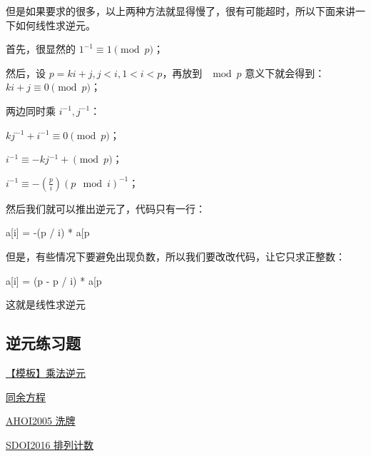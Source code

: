 但是如果要求的很多，以上两种方法就显得慢了，很有可能超时，所以下面来讲一下如何线性求逆元。

首先，很显然的 $1^{-1} \equiv 1 \pmod p$；

然后，设 $p=ki+j,j<i,1<i<p$，再放到 $\mod p$ 意义下就会得到：$ki+j \equiv 0 \pmod p$；

两边同时乘 $i^{-1},j^{-1}$：

$kj^{-1}+i^{-1} \equiv 0 \pmod p$；

$i^{-1} \equiv -kj^{-1}+ \pmod p$；

$i^{-1} \equiv -(\frac{p}{i}) (p \mod i)^{-1}$；

然后我们就可以推出逆元了，代码只有一行：

\begin{cppcode}
a[i] = -(p / i) * a[p %
\end{cppcode}

但是，有些情况下要避免出现负数，所以我们要改改代码，让它只求正整数：

\begin{cppcode}
a[i] = (p - p / i) * a[p %
\end{cppcode}

这就是线性求逆元

\subsection{逆元练习题}

\href{https://www.luogu.org/problemnew/show/P3811}{【模板】乘法逆元}

\href{https://www.luogu.org/problemnew/show/P1082}{同余方程}

\href{https://www.lydsy.com/JudgeOnline/problem.php?id=1965}{AHOI2005 洗牌}

\href{https://www.luogu.org/problemnew/show/P4071}{SDOI2016 排列计数}
